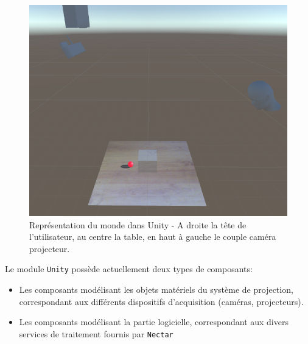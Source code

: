 \begin{figure}[ht]
\centering
\includegraphics[width=0.65\linewidth]{images/unityscene}
\caption{Représentation du monde dans Unity - A droite la tête de l'utilisateur, au centre la table, en haut à gauche le couple caméra projecteur.}
\label{fig:unityrealworld}
\end{figure}

Le module \texttt{Unity} possède actuellement deux types de composants:
\begin{itemize}
\item Les composants modélisant les objets matériels du système de projection, correspondant aux différents dispositifs d'acquisition (caméras, projecteurs).
\item Les composants modélisant la partie logicielle, correspondant aux divers services de traitement fournis par \texttt{Nectar}
\end{itemize}

